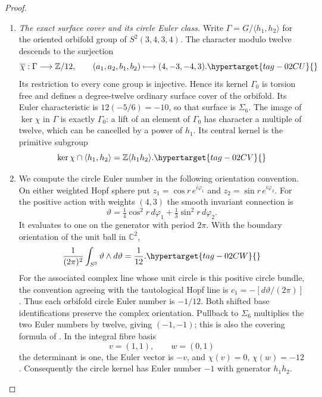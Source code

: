 \documentclass[11pt,a4paper]{article}
\numberwithin{equation}{section}
\theoremstyle{definition}
\begin{document}
\begin{proof}
\begin{enumerate}[label=\arabic*.,leftmargin=*]
\item \emph{The exact surface cover and its circle Euler class.}
Write $\Gamma=G/\langle h_1,h_2\rangle$ for the oriented
orbifold group of $S^2(3,4,3,4)$. The character modulo
twelve descends to the surjection
\begin{equation}
 \overline\chi:\Gamma\longrightarrow\mathbb Z/12,
       \qquad(a_1,a_2,b_1,b_2)\longmapsto(4,-3,-4,3).
 \hypertarget{tag-02CU}{}\label{maps:eq:E.S26}
\end{equation}
Its restriction to every cone group is injective. Hence its
kernel $\Gamma_0$ is torsion free and defines a degree-twelve
ordinary surface cover of the orbifold. Its Euler characteristic
is $12(-5/6)=-10$, so that surface is $\Sigma_6$. The image
of $\ker\chi$ in $\Gamma$ is exactly $\Gamma_0$: a lift of
an element of $\Gamma_0$ has character a multiple of twelve,
which can be cancelled by a power of $h_1$. Its central
kernel is the primitive subgroup
\begin{equation}
 \ker\chi\cap\langle h_1,h_2\rangle
                =\mathbb Z\langle h_1h_2\rangle.
 \hypertarget{tag-02CV}{}\label{maps:eq:E.S27}
\end{equation}

\item We compute the circle Euler number in the following orientation convention. On either weighted Hopf sphere put
$z_1=\cos r\,e^{i\varphi_1}$ and
$z_2=\sin r\,e^{i\varphi_2}$. For the positive action with
weights $(4,3)$ the smooth invariant connection is
\[
 \vartheta=\tfrac14\cos^2r\,d\varphi_1
                    +\tfrac13\sin^2r\,d\varphi_2.
\]
It evaluates to one on the generator with period $2\pi$.
With the boundary orientation of the unit ball in $\mathbb C^2$,
\begin{equation}
             \frac1{(2\pi)^2}\int_{S^3}\vartheta\wedge d\vartheta
                         =\frac1{12}.
 \hypertarget{tag-02CW}{}\label{maps:eq:E.S28}
\end{equation}
For the associated complex line whose unit circle is this
positive circle bundle, the convention agreeing with the
tautological Hopf line is $c_1=-[d\vartheta/(2\pi)]$.
Thus each orbifold circle Euler number is $-1/12$.
Both shifted base identifications preserve the complex
orientation. Pullback to $\Sigma_6$ multiplies the two Euler
numbers by twelve, giving $(-1,-1)$; this is also the
covering formula of \cite[Theorem 3.6]{rootScott83}.
In the integral fibre basis
\[
                  v=(1,1),\qquad w=(0,1)
\]
the determinant is one, the Euler vector is $-v$, and
$\chi(v)=0$, $\chi(w)=-12$. Consequently the circle kernel
has Euler number $-1$ with generator $h_1h_2$.


\end{enumerate}
\end{proof}
\end{document}
